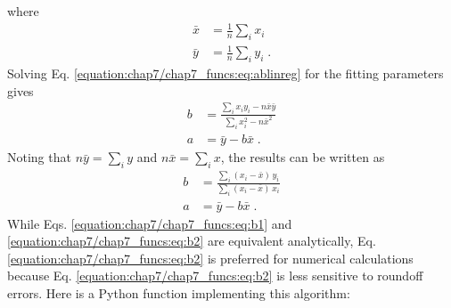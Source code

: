 \documentclass[letterpaper,10pt,english]{sphinxmanual}
\begin{document}
where
\begin{equation}\label{equation:chap7/chap7_funcs:eq:linreg3}
\begin{split}\bar{x} &= \frac{1}{n}\sum_{i}x_{i}\\
\bar{y} &= \frac{1}{n}\sum_{i}y_{i}\;.\end{split}
\end{equation}
\sphinxAtStartPar
Solving Eq. \eqref{equation:chap7/chap7_funcs:eq:ablinreg} for the fitting parameters gives
\begin{equation}\label{equation:chap7/chap7_funcs:eq:b1}
\begin{split}b &= \frac{\sum_{i}x_{i}y_{i} - n\bar{x}\bar{y}} {\sum_{i}x_{i}^2 - n \bar{x}^2}\\
a &= \bar{y} - b\bar{x} \;.\end{split}
\end{equation}
\sphinxAtStartPar
Noting that \(n\bar{y}=\sum_{i}y\) and \(n\bar{x}=\sum_{i}x\), the results can be written as
\begin{equation}\label{equation:chap7/chap7_funcs:eq:b2}
\begin{split}b &= \frac{\sum_{i}(x_{i}- \bar{x})\,y_{i}} {\sum_{i}(x_{i}- \bar{x})\,x_{i}} \\
a &= \bar{y} - b\bar{x} \;.\end{split}
\end{equation}
\sphinxAtStartPar
While Eqs. \eqref{equation:chap7/chap7_funcs:eq:b1} and \eqref{equation:chap7/chap7_funcs:eq:b2} are equivalent analytically, Eq. \eqref{equation:chap7/chap7_funcs:eq:b2} is preferred for numerical calculations because Eq. \eqref{equation:chap7/chap7_funcs:eq:b2} is less sensitive to roundoff errors.  Here is a Python function implementing this algorithm:

\begin{sphinxVerbatim}[commandchars=\\\{\},numbers=left,firstnumber=1,stepnumber=1]
  
      
      
      
      
\end{sphinxVerbatim}
\end{document}
